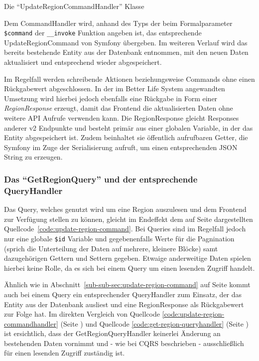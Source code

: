 \documentclass[a4paper,12pt,twoside]{scrreprt}
\begin{document}
\pagebreak

\begin{listing}[ht]
    \inputminted[fontsize=\footnotesize,linenos,breaklines]{php}{code/update_region_commandhandler.php}
    \caption[Die \enquote{UpdateRegionCommandHandler} Klasse]{Die \enquote{UpdateRegionCommandHandler} Klasse}
    \label{code:update-region-commandhandler}
\end{listing}

Dem CommandHandler wird, anhand des Typs der beim Formalparameter \texttt{\$command} der \texttt{\_\_invoke} Funktion angeben ist, das entsprechende UpdateRegionCommand von Symfony übergeben. Im weiteren Verlauf wird das bereits bestehende Entity aus der Datenbank entnommen, mit den neuen Daten aktualisiert und entsprechend wieder abgespeichert.

Im Regelfall werden schreibende Aktionen beziehungsweise Commands ohne einen Rückgabewert abgeschlossen. \parencite[]{fowler_commandqueryseparation_2005} In der im Better Life System angewandten Umsetzung wird hierbei jedoch ebenfalls eine Rückgabe in Form einer \textit{RegionResponse} erzeugt, damit das Frontend die aktualisierten Daten ohne weitere API Aufrufe verwenden kann. Die RegionResponse gleicht Responses anderer v2 Endpunkte und besteht primär aus einer globalen Variable, in der das Entity abgespeichert ist. Zudem beinhaltet sie öffentlich aufrufbaren Getter, die Symfony im Zuge der Serialisierung aufruft, um einen entsprechenden JSON String zu erzeugen.

\subsubsection{Das \enquote{GetRegionQuery} und der entsprechende QueryHandler}
\label{sub-sub-sec:get-region-query}
Das Query, welches genutzt wird um eine Region auszulesen und dem Frontend zur Verfügung stellen zu können, gleicht im Endeffekt dem auf Seite \pageref{code:update-region-command} dargestellten Quellcode~\ref{code:update-region-command}. Bei Queries sind im Regelfall jedoch nur eine globale \texttt{\$id} Variable und gegebenenfalls Werte für die Pagnination (sprich die Unterteilung der Daten auf mehrere, kleinere Blöcke) samt dazugehörigen Gettern und Settern gegeben. Etwaige anderweitige Daten spielen hierbei keine Rolle, da es sich bei einem Query um einen lesenden Zugriff handelt.

\medskip

Ähnlich wie in Abschnitt~\ref{sub-sub-sec:update-region-command} auf Seite \pageref{sub-sub-sec:update-region-command} kommt auch bei einem Query ein entsprechender QueryHandler zum Einsatz, der das Entity aus der Datenbank ausliest und eine RegionResponse als Rückgabewert zur Folge hat. Im direkten Vergleich von Quellcode \ref{code:update-region-commandhandler} (Seite \pageref{code:update-region-commandhandler}) und Quellcode \ref{code:get-region-queryhandler} (Seite \pageref{code:get-region-queryhandler}) ist ersichtlich, dass der GetRegionQueryHandler keinerlei Änderung an bestehenden Daten vornimmt und - wie bei CQRS beschrieben - ausschließlich für einen lesenden Zugriff zuständig ist.
\end{document}
